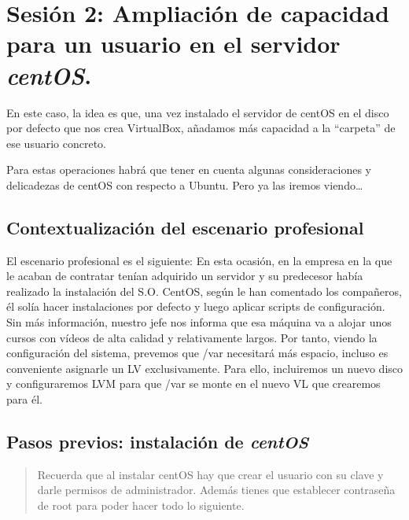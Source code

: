 \documentclass[
]{memoir}
\begin{document}
\hypertarget{sesiuxf3n-2-ampliaciuxf3n-de-capacidad-para-un-usuario-en-el-servidor-centos.}{%
\section{\texorpdfstring{Sesión 2: Ampliación de capacidad para un usuario en el servidor \textbf{\emph{centOS}}.}{Sesión 2: Ampliación de capacidad para un usuario en el servidor centOS.}}\label{sesiuxf3n-2-ampliaciuxf3n-de-capacidad-para-un-usuario-en-el-servidor-centos.}}

En este caso, la idea es que, una vez instalado el servidor de centOS en el disco por defecto que nos crea VirtualBox, añadamos más capacidad a la ``carpeta'' de ese usuario concreto.

Para estas operaciones habrá que tener en cuenta algunas consideraciones y delicadezas de centOS con respecto a Ubuntu. Pero ya las iremos viendo\ldots{}

\hypertarget{contextualizaciuxf3n-del-escenario-profesional}{%
\subsection{Contextualización del escenario profesional}\label{contextualizaciuxf3n-del-escenario-profesional}}

El escenario profesional es el siguiente: En esta ocasión, en la empresa en la que le acaban de contratar tenían adquirido un servidor y su predecesor había realizado la instalación del S.O. CentOS, según le han comentado los compañeros, él solía hacer instalaciones por defecto y luego aplicar scripts de configuración. Sin más información, nuestro jefe nos informa que esa máquina va a alojar unos cursos con vídeos de alta calidad y relativamente largos. Por tanto, viendo la configuración del sistema, prevemos que /var necesitará más espacio, incluso es conveniente asignarle un LV exclusivamente. Para ello, incluiremos un nuevo disco y configuraremos LVM para que /var se monte en el nuevo VL que crearemos para él.

\hypertarget{pasos-previos-instalaciuxf3n-de-centos}{%
\subsection{\texorpdfstring{Pasos previos: instalación de \textbf{\emph{centOS}}}{Pasos previos: instalación de centOS}}\label{pasos-previos-instalaciuxf3n-de-centos}}

\begin{quote}
Recuerda que al instalar centOS hay que crear el usuario con su clave y darle permisos de administrador. Además tienes que establecer contraseña de root para poder hacer todo lo siguiente.
\end{quote}
\end{document}

